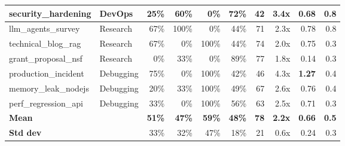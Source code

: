 \documentclass[journal]{IEEEtran}
\begin{document}
\begin{table}[t]
\begin{tabular}{@{}p{3.9cm}p{2.2cm}rrrrrrrr@{}}
    security\_hardening       & DevOps   & 25\%& 60\%&  0\%& 72\%&  42&3.4x&0.68& 0.8 \\
    \midrule
    llm\_agents\_survey       & Research & 67\%&100\%&  0\%& 44\%&  71&2.3x&0.78& 0.8 \\
    technical\_blog\_rag      & Research & 67\%&  0\%&100\%& 44\%&  74&2.0x&0.75& 0.3 \\
    grant\_proposal\_nsf      & Research &  0\%& 33\%&  0\%& 89\%&  77&1.8x&0.14& 0.3 \\
    \midrule
    production\_incident      & Debugging& 75\%&  0\%&100\%& 42\%&  46&4.3x&\textbf{1.27}& 0.4 \\
    memory\_leak\_nodejs      & Debugging& 20\%& 33\%&100\%& 49\%&  67&2.6x&0.76& 0.4 \\
    perf\_regression\_api     & Debugging& 33\%&  0\%&100\%& 56\%&  63&2.5x&0.71& 0.3 \\
    \midrule
    \rowcolor{rowours}
    \textbf{Mean}             &          &\textbf{51\%}&\textbf{47\%}&\textbf{59\%}&\textbf{48\%}&
    \textbf{78}&\textbf{2.2x}&\textbf{0.66}&\textbf{0.5} \\
    \textbf{Std dev}          &          & 33\% & 32\% & 47\% & 18\% &
    21 & 0.6x & 0.24 & 0.3 \\
    \bottomrule
  \end{tabular}
\end{table}
\end{document}
